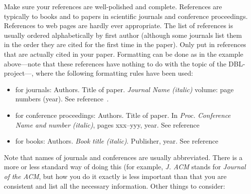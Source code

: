 \documentclass[11pt]{article}
\begin{document}
									Make sure your references are well-polished and complete.
									References are typically to books and to papers in scientific
									journals and conference proceedings. References to web pages are hardly
									ever appropriate.
									The list of references is usually ordered alphabetically by first author (although some journals
											list them in the order they are cited for the first time in the paper).
									Only put in references that are actually cited in your paper.
									Formatting can be done as in the example above---note that these references have
									nothing to do with the topic of the DBL-project---, where the following
									formatting rules have been used:
									\begin{itemize}
									\item for journals:
									Authors. Title of paper. \emph{Journal Name (italic)} volume: page numbers (year).
									See reference~\cite{m-apca-83}.
									\item for conference proceedings:
									Authors. Title of paper. In \emph{Proc. Conference Name and number (italic)}, pages xxx--yyy, year.
									See reference~\cite{a-raoa-02}
									\item for books: Authors. \emph{Book title (italic)}. Publisher, year.
									See reference~\cite{clrs-ia-01}
									\end{itemize}
									Note that names of journals and conferences are usually abbreviated. There is a more
									or less standard way of doing this (for example, \emph{J. ACM} stands for \emph{Journal of the ACM},
											but how you do it exactly is less important than that
											you are consistent and list all the necessary information. Other things to consider:
\end{document}
